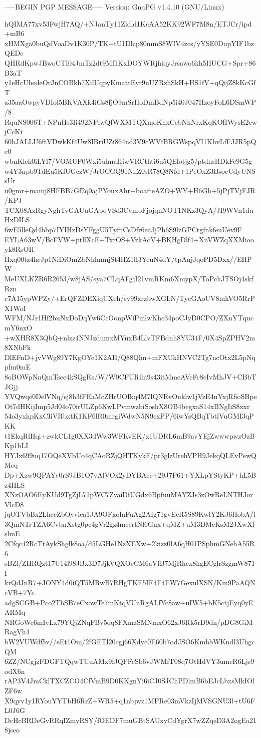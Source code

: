 -----BEGIN PGP MESSAGE-----
Version: GnuPG v1.4.10 (GNU/Linux)

hQIMA77xv53FwjH7AQ/+NJanTy11Zldld1KcAA52KK92WF7M8n/ETJCr/ipd+mB6
xHMXga0buQdVoaDv1K30P/TK+tU1Dlcp80mmS8WIV4zcs/yYSE0DupYIF1bzQEDc
QHRdKpwJBwoCTI04JmTz2dt9Mf1KxDOYWRjhiqyJrsawo6kh5HUCG+Spr+86B3aT
y1eHcUhedeOrJnCOBkh7XilUqpyKmattEyr9nUZRzhSkH+HS1fV+qQijZ8kKcGfT
a35aaOwpyVDIol5BKVAXk4iGs8fjO9mSrHoDmBdNp5i40J047HzoyFoL6DSmWP/8
RquNS006T+NPnHs3Ii492NPlwQfWXMTQXmoKhxCebNhNrxKqKOfIWysE2cwjCcKi
60bJALLU6ftVDwkKf4Uw8IBriUZi864nd3V9cWVfBRGWspqVI1KhvLfFJJR5pQe0
wbnKlek0iLYl7/VOMUF0Wxi5ulmaHiwVRCthti6u5QElotjg5/ptdnsRDkFe9G5g
w4Y3npb9TdEu5KfUGczW/JrOCGQ91NllZ0sR78Q8Nfd+1PeOxZ3BsocUdyUNSsUr
u0gmr+mamj8HFBB7Gf2q0ajPYouxAhr+boafteAZO+WY+H6Gh+5jPjTVjFJR/KPJ
TCX08AzRgyNghTvGAUuGApqVSd3CvmpFjojqnNOT1NKz3QyA/JI9WVn1duHxDILS
6wE5lleQd4bbp7IYIHzDsYFggU5TyfnCsDfr6ea3jPh6S9lzGPCtgfnkfeuUev9F
EYLA63wV/BcFVW+ptllXcE+TxrOS+VzkAoV+BKHgDlf4+XnVWZqXXMiooyk8RsOH
Hxq00tz4heJp1NiDiOmZbNhhnmjSt4HZ1lI3YeuN4dY/tpAnjJqoPD5Dxx//EHPW
MeUXLKZR6R2653/w8jAS/sya7CLqAFgjI21vmRKm6XmypX/ToPchJTSOj4skfRzn
c7A15ypWPZy/+ErQFZDEXiqUXeh/sy99xrzbwXGLN/TycGAoUV8mkVO5RrPX1WoI
WFM/NJr1Hf2buNxDoDqYw6CcOonpWiPmlwKhc34poCJyD0CPO/ZXnYTqucmY6nxO
+wXHR8X3QbQ+nlzz4NNJzdumxMYuxB4LlvTFBdnh8YU34F/0X4SpZPHV2m8XNbFk
DlEFnD+jvVWg89Y7KgOYe1K2AH/Q88Qhn+mFXUkHNVC2Tg7ncOtx2L5pNqpfm0mE
8oBOWpNnQmTsee4kSQgRs/W/W9CFURiln9s43itMmcAVcFc8cIvMhJV+CBbTJGjj
YVQwqe0DelVNq/sj8h3fFEaMcZHrUOIkq4M7lQNRvOnklw1jVzE4nYxjRfioSBpe
Ot7dHKijImp5Jd04o70irULZp6KwLPvmwzbiSoshX8OB4begxaS14xBNgIiS8xxr
54o3yxhpKxCIiVRbxtK1KF6lR0mrgiWdwN5N9cxPP/6iwYsQBqTbtlVuGMI3qPKK
t1EkqRlHqi+zwkCL1g0XX3dWw3WFKvEK/x1UDRL6mB9avYEjZwwwpwzOzBKp1bLI
HYJx699uq17OQeXVbUo4qCAoRZjQHTKykF/pr3glzUrehVPH9JekqQLEvPewQMcq
Dp+Xzw9QPAYv0rS9JB1O7vAlVOx2yDYBAcc+29J7P61+YXLpYStyKP+hL5Bz4HLS
XNzOAO6EyKUd9TgZjL71pWC7ZvaiDfUGdx6BpfuuMAYZJs3zOwReLNTHJorVlcD8
jqOTVbBx2LhecZbOyviea1JA9OFxolnFuAg2AIg71gvEcR5S89KwlY2KJ6HobA/l
3QmNTrTZA6CvbnXstg0pc4gVr2gz4mccrtNl6Gnx+qMZ+uM3DMeKsM2JXwXfslmE
2Cfqc42RcTtAykShglk8oa/d5LGHe1NzXEXw+2kizz0lA6qH01PSphmGNehA55R6
sBZl/ZHRQzt17U14l98JBx3D7JjkVQXOeCM6aVfB7MjRhex8kgECglrSzgmW871I
krQdJnR7+JONY4d0iQT5MRwB7RHgTKE5IE4F4EW7GexulXSN/Km9PaAQNcVB+7Yc
adgSCGB+Pco2TbSB7eCxowTe7mKtqVUuRgALfYc8aw+uIW5+bK5ctjEyq0yEARMq
NRGoWe6mIvLx79YQjZNqFBv5oq8FXmzSMNmxO62xJ6Rk5rD9dn/pDG8GiMRagVh4
bW2VUWdf5v//eEt1Om/2fGETl20cgj66Xdyc0E60b7odJSO6KmhbWKndl3UhgcQM
6ZZ/NCgjzFDGFTQqwTUuAMx9fJQFFcSb6vJWMfT08q7OtHdVY3umcR6Ljs9odX6n
rAP3V4JmCklTXCZCO4CfVmB9D0KKgnYi6iCJ0SJChPDlmB6bEJcLbxsMkIOlZF6w
X9qyv1y1RYouYYTbH6RrZ+WR5+q1nbjwz1MPRe03mVkzIjMVSGNU3l+tU6FL0J6G
DcHcBRDeGvRRqIZmyRSY/fOEDF7muGBtSAUxyCdYgrX7wZZqeD3A2ogEa218jseo
